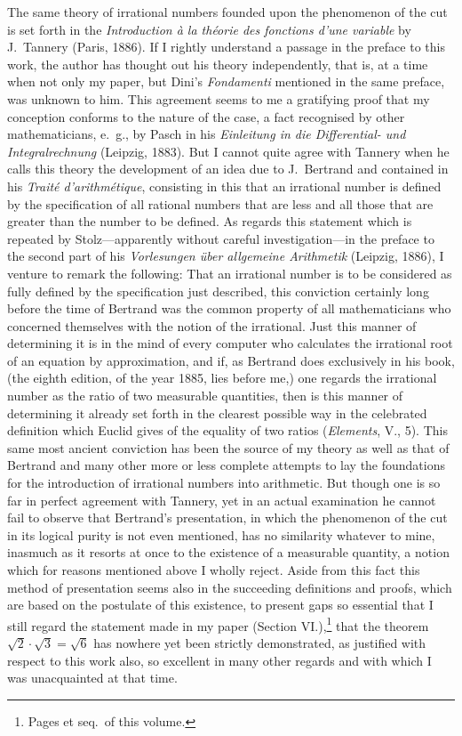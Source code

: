 \documentclass[oneside]{book}
\begin{document}
The same theory of irrational numbers founded
upon the phenomenon of the cut is set forth in the
\textit{Introduction à la théorie des fonctions d'une variable} by
J.~Tannery (Paris, 1886). If I rightly understand a
passage in the preface to this work, the author has
thought out his theory independently, that is, at a
time when not only my paper, but Dini's \textit{Fondamenti}
mentioned in the same preface, was unknown to him.
This agreement seems to me a gratifying proof that
my conception conforms to the nature of the case, a
fact recognised by other mathematicians, e.~g., by
Pasch in his \textit{Einleitung in die Differential- und Integralrechnung}
(Leipzig, 1883). But I cannot quite agree
with Tannery when he calls this theory the development
of an idea due to J.~Bertrand and contained in
his \textit{Traité d'arithmétique}, consisting in this that an irrational
number is defined by the specification of all
rational numbers that are less and all those that are
greater than the number to be defined. As regards
this statement which is repeated by Stolz---apparently
without careful investigation---in the preface to the
second part of his \textit{Vorlesungen über allgemeine Arithmetik}
(Leipzig, 1886), I venture to remark the following:
That an irrational number is to be considered
as fully defined by the specification just described,
this conviction certainly long before the time of Bertrand
was the common property of all mathematicians
who concerned themselves with the notion of the
irrational. Just this manner of determining it is in
the mind of every computer who calculates the irrational
root of an equation by approximation, and if,
as Bertrand does exclusively in his book, (the eighth
edition, of the year 1885, lies before me,) one regards
the irrational number as the ratio of two measurable
quantities, then is this manner of determining it
already set forth in the clearest possible way in the
celebrated definition which Euclid gives of the equality
of two ratios (\textit{Elements}, V., 5). This same most
ancient conviction has been the source of my theory
as well as that of Bertrand and many other more or
less complete attempts to lay the foundations for the
introduction of irrational numbers into arithmetic.
But though one is so far in perfect agreement with
Tannery, yet in an actual examination he cannot fail
to observe that Bertrand's presentation, in which the
phenomenon of the cut in its logical purity is not
even mentioned, has no similarity whatever to mine,
inasmuch as it resorts at once to the existence of a
measurable quantity, a notion which for reasons mentioned
above I wholly reject. Aside from this fact
this method of presentation seems also in the succeeding
definitions and proofs, which are based on the
postulate of this existence, to present gaps so essential
that I still regard the statement made in my paper
(Section VI.),\footnote
  {Pages \pageref{EISVI} et seq.\ of this volume.}
that the theorem $\sqrt{2}\cdot\sqrt{3}=\sqrt{6}$ has nowhere
yet been strictly demonstrated, as justified with
respect to this work also, so excellent in many other
regards and with which I was unacquainted at that
time.
\end{document}
